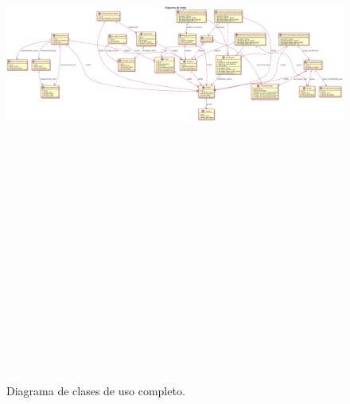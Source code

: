 	\begin{figure}[h]
		\centering
		\includegraphics[width=15cm, height=21cm]{img/dc_full}
		\caption{Diagrama de clases de uso completo.}
		\label{dc_full}
	\end{figure}